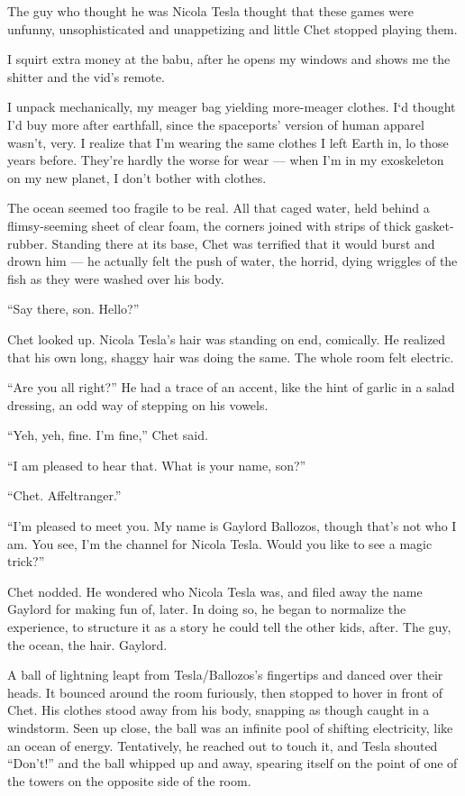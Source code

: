 The guy who thought he was Nicola Tesla thought that these games
were unfunny, unsophisticated and unappetizing and little Chet
stopped playing them.

I squirt extra money at the babu, after he opens my windows and
shows me the shitter and the vid's remote.

I unpack mechanically, my meager bag yielding more-meager clothes.
I`d thought I'd buy more after earthfall, since the spaceports'
version of human apparel wasn't, very. I realize that I'm wearing
the same clothes I left Earth in, lo those years before. They're
hardly the worse for wear --- when I'm in my exoskeleton on my new
planet, I don't bother with clothes.

\tb

The ocean seemed too fragile to be real. All that caged water, held
behind a flimsy-seeming sheet of clear foam, the corners joined
with strips of thick gasket-rubber. Standing there at its base,
Chet was terrified that it would burst and drown him --- he
actually felt the push of water, the horrid, dying wriggles of the
fish as they were washed over his body.

``Say there, son. Hello?''

Chet looked up. Nicola Tesla's hair was standing on end, comically.
He realized that his own long, shaggy hair was doing the same. The
whole room felt electric.

``Are you all right?'' He had a trace of an accent, like the hint
of garlic in a salad dressing, an odd way of stepping on his
vowels.

``Yeh, yeh, fine. I'm fine,'' Chet said.

``I am pleased to hear that. What is your name, son?''

``Chet. Affeltranger.''

``I'm pleased to meet you. My name is Gaylord Ballozos, though that's not who I 
am. You see, I'm the channel for Nicola Tesla. Would you like to see a magic 
trick?''

Chet nodded. He wondered who Nicola Tesla was, and filed away the
name Gaylord for making fun of, later. In doing so, he began to
normalize the experience, to structure it as a story he could tell
the other kids, after. The guy, the ocean, the hair. Gaylord.

A ball of lightning leapt from Tesla/Ballozos's fingertips and
danced over their heads. It bounced around the room furiously, then
stopped to hover in front of Chet. His clothes stood away from his
body, snapping as though caught in a windstorm. Seen up close, the
ball was an infinite pool of shifting electricity, like an ocean of
energy. Tentatively, he reached out to touch it, and Tesla shouted
``Don't!'' and the ball whipped up and away, spearing itself on the
point of one of the towers on the opposite side of the room.

